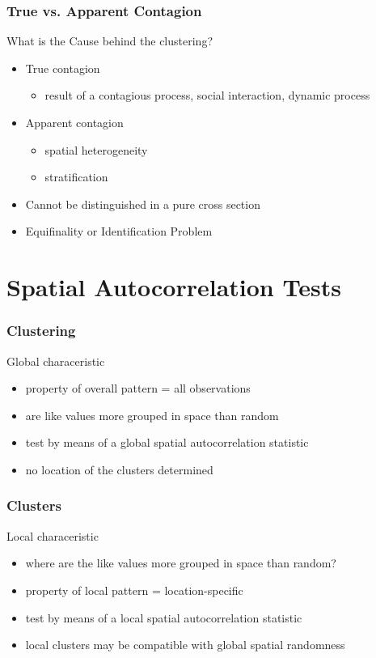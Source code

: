 \documentclass[nototal]{beamer}
\begin{document}
\begin{frame}
  \frametitle{True vs. Apparent Contagion}
  \begin{block}{What is the Cause behind the clustering?}  
    \begin{itemize}
      \item True contagion
	\begin{itemize}
	  \item result of a contagious process, social interaction, dynamic
	    process
	\end{itemize}
      \item Apparent contagion
	\begin{itemize}
	  \item spatial heterogeneity
	  \item stratification
	\end{itemize}
      \item Cannot be distinguished in a pure cross section
      \item Equifinality or Identification Problem
    \end{itemize}
  \end{block}
\end{frame}

\section{Spatial Autocorrelation Tests}

\begin{frame}
  \frametitle{Clustering}
  \begin{block}{Global characeristic}
    \begin{itemize}
      \item property of overall pattern = all observations
      \item are like values more grouped in space than random
      \item test by means of a global spatial autocorrelation statistic
      \item no location of the clusters determined
    \end{itemize}
   \end{block}
 \end{frame}


\begin{frame}
  \frametitle{Clusters}
  \begin{block}{Local characeristic}
    \begin{itemize}
      \item where are the like values more grouped in space than random?
      \item property of local pattern = location-specific
      \item test by means of a local spatial autocorrelation statistic
      \item local clusters may be compatible with global spatial randomness
    \end{itemize}
   \end{block}
 \end{frame}
\end{document}
